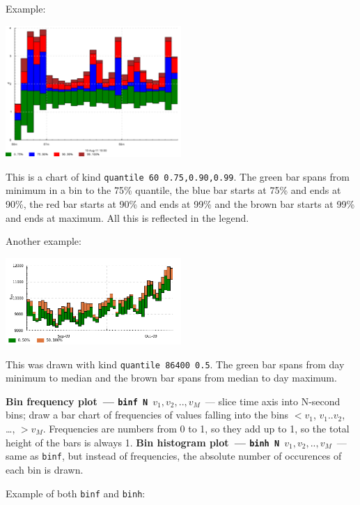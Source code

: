 \documentclass{article}
\begin{document}
Example:

{\centering \includegraphics[width=0.5\textwidth]{pics/tplot/tplot-rmq-latency-2.png}}

This is a chart of kind \texttt{quantile 60 0.75,0.90,0.99}. The green bar spans from minimum in a bin to the 75\% quantile, the blue bar starts at 75\% and ends at 90\%, the red bar starts at 90\% and ends at 99\% and the brown bar starts at 99\% and ends at maximum. All this is reflected in the legend.

Another example:

{\centering \includegraphics[width=0.5\textwidth]{pics/tplot/median.png}}

This was drawn with kind \texttt{quantile 86400 0.5}. The green bar spans from day minimum to median and the brown bar spans from median to day maximum.

\pagebreak
\noindent
\textbf{Bin frequency plot~--- \texttt{binf N $v_1,v_2,..,v_M$}}~--- slice time axis into N-second bins; draw a bar chart of frequencies of values falling into the bins $<v_1$, $v_1..v_2$, \ldots, $>v_M$. Frequencies are numbers from 0 to 1, so they add up to 1, so the total height of the bars is always 1.
\noindent
\textbf{Bin histogram plot~--- \texttt{binh N $v_1,v_2,..,v_M$}}~--- same as \texttt{binf}, but instead of frequencies, the absolute number of occurences of each bin is drawn.

Example of both \texttt{binf} and \texttt{binh}:
\end{document}
